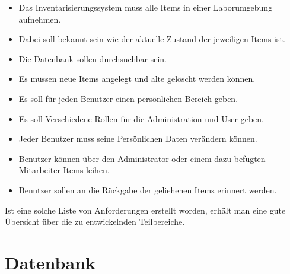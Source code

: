 \begin{itemize}
	\item Das Inventarisierungssystem muss alle Items in einer Laborumgebung aufnehmen. 
	
	\item Dabei soll bekannt sein wie der aktuelle Zustand der jeweiligen Items ist. 
	
	\item Die Datenbank sollen durchsuchbar sein. 
	
	\item Es müssen neue Items angelegt und alte gelöscht werden können. 
	
	\item Es soll für jeden Benutzer einen persönlichen Bereich geben. 
	
	\item Es soll Verschiedene Rollen für die Administration und User geben.
	
	\item Jeder Benutzer muss seine Persönlichen Daten verändern können.
	
	\item Benutzer können über den Administrator oder einem dazu befugten Mitarbeiter Items leihen.
	
	\item Benutzer sollen an die Rückgabe der geliehenen Items erinnert werden.
	
	
\end{itemize}

Ist eine solche Liste von Anforderungen erstellt worden, erhält man eine gute Übersicht über die zu entwickelnden Teilbereiche.

\newpage


\section{Datenbank}
\label{konzept:database}

